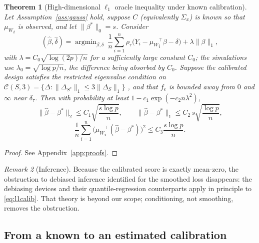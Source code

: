 \documentclass[12pt,a4paper]{article}
\newtheorem{theorem}{Theorem}[section]
\theoremstyle{definition}
\theoremstyle{remark}
\newtheorem{remark}[theorem]{Remark}
\newcommand{\cC}{\mathcal{C}}
\newcommand{\argmin}{\mathop{\mathrm{argmin}}}
\newcommand{\betas}{\beta^*}
\newcommand{\muv}{\mu_W}
\newcommand{\Ccal}{C}
\begin{document}
\begin{theorem}[High-dimensional $\ell_1$ oracle inequality under known calibration]
\label{thm:highdim}
Let Assumption~\ref{ass:gauss} hold, suppose $\Ccal$ (equivalently $\Sigma_x$) is known so
that ${\muv}_i$ is observed, and let $\|\betas\|_0=s$. Consider
\begin{equation}
(\hat\beta,\hat\delta) = \argmin_{\beta,\delta}\ \frac1n\sum_{i=1}^n
\rho_\tau\big(Y_i-{\muv}_i^\top\beta-\delta\big) + \lambda\|\beta\|_1 ,
\label{eq:l1calib}
\end{equation}
with $\lambda = C_0\sqrt{\log(2p)/n}$ for a sufficiently large constant $C_0$; the
simulations use $\lambda_0=\sqrt{\log p/n}$, the difference being absorbed by $C_0$. Suppose the
calibrated design satisfies the restricted eigenvalue condition on
$\cC(S,3)=\{\Delta:\|\Delta_{S^c}\|_1\le3\|\Delta_S\|_1\}$ \citep{bickel2009simultaneous},
and that $f_e$ is bounded away from $0$ and $\infty$ near $\delta_\tau$. Then with
probability at least $1-c_1\exp(-c_2n\lambda^2)$,
\begin{equation}
\|\hat\beta-\betas\|_2 \le C_1\sqrt{\frac{s\log p}{n}},
\qquad
\|\hat\beta-\betas\|_1 \le C_2\,s\sqrt{\frac{\log p}{n}},
\end{equation}
\begin{equation}
\frac1n\sum_{i=1}^n\big({\muv}_i^\top(\hat\beta-\betas)\big)^2 \le C_3\frac{s\log p}{n}.
\end{equation}
\end{theorem}

\begin{proof}
See Appendix~\ref{app:proofs}.
\end{proof}

\begin{remark}[Inference]
Because the calibrated score is exactly mean-zero, the obstruction to debiased inference
identified for the smoothed loss disappears: the debiasing devices
\citep{zhang2014confidence,vandegeer2014asymptotically,javanmard2014hypothesis} and their
quantile-regression counterparts \citep{bradic2017uniform} apply in principle to
\eqref{eq:l1calib}. That theory is beyond our scope; conditioning, not smoothing, removes the
obstruction.
\end{remark}

\subsection{From a known to an estimated calibration}
\label{sec:open}
\end{document}
